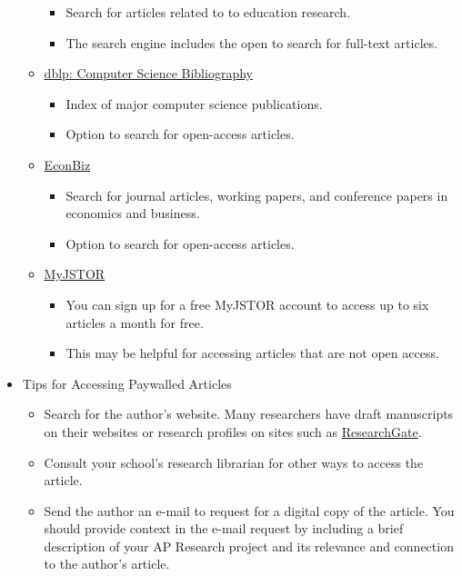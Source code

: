 \documentclass[]{book}
\providecommand{\tightlist}{%
  \setlength{\itemsep}{0pt}\setlength{\parskip}{0pt}}
\begin{document}
\begin{itemize}
\begin{itemize}
    \begin{itemize}
    \tightlist
    \item
      Search for articles related to to education research.
    \item
      The search engine includes the open to search for full-text articles.
    \end{itemize}
  \item
    \href{https://dblp.org/}{dblp: Computer Science Bibliography}

    \begin{itemize}
    \tightlist
    \item
      Index of major computer science publications.
    \item
      Option to search for open-access articles.
    \end{itemize}
  \item
    \href{https://www.econbiz.de/}{EconBiz}

    \begin{itemize}
    \tightlist
    \item
      Search for journal articles, working papers, and conference papers in economics and business.
    \item
      Option to search for open-access articles.
    \end{itemize}
  \item
    \href{https://support.jstor.org/hc/en-us/articles/115004760028-MyJSTOR-How-to-Register-Get-Free-Access-to-Content}{MyJSTOR}

    \begin{itemize}
    \tightlist
    \item
      You can sign up for a free MyJSTOR account to access up to six articles a month for free.
    \item
      This may be helpful for accessing articles that are not open access.
    \end{itemize}
  \end{itemize}
\item
  Tips for Accessing Paywalled Articles

  \begin{itemize}
  \tightlist
  \item
    Search for the author's website. Many researchers have draft manuscripts on their websites or research profiles on sites such as \href{https://www.researchgate.net/}{ResearchGate}.
  \item
    Consult your school's research librarian for other ways to access the article.
  \item
    Send the author an e-mail to request for a digital copy of the article. You should provide context in the e-mail request by including a brief description of your AP Research project and its relevance and connection to the author's article.
  \end{itemize}
\end{itemize}
\end{document}
